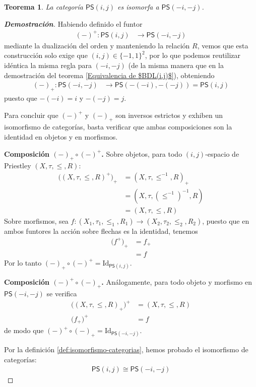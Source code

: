 \documentclass[12pt]{book}
\newtheorem{theorem}{Teorema}[section]
\newcommand{\Id}{\mathrm{Id}}
\newcommand{\PS}{\mathsf{PS}}
\begin{document}
\begin{theorem}\label{Equivalencia de $PS(i,j)$} La categoría $\PS(i,j)$ es isomorfa a $\PS(-i,-j)$.
\end{theorem}
\begin{proof}[\textbf{Demostración}]
Habiendo definido el funtor
\begin{align*}
(-)^{+} : \PS(i,j) &\to \PS(-i,-j)
\end{align*}
mediante la dualización del orden y manteniendo la relación $R$, vemos que esta construcción solo exige que $(i,j)\in\{-1,1\}^2$, por lo que podemos reutilizar idéntica la misma regla para $(-i,-j)$ (de la misma manera que en la demostración del teorema  \ref{Equivalencia de $BDL(i,j)$}), obteniendo
\begin{align*}
(-)_{+} : \PS(-i,-j) &\to \PS(-(-i),-(-j)) = \PS(i,j)
\end{align*}
puesto que $-(-i)=i$ y $-(-j)=j$.

Para concluir que $(-)^{+}$ y $(-)_{+}$ son inversos estrictos y exhiben un isomorfismo de categorías, basta verificar que ambas composiciones son la identidad en objetos y en morfismos.

\medskip
\noindent\textbf{Composición $(-)_{+}\circ(-)^{+}$.}  
Sobre objetos, para todo $(i,j)$-espacio de Priestley $(X,\tau,\le,R)$:
\begin{align*}
\bigl((X,\tau,\le,R)^{+}\bigr)_{+}
&= (X,\tau,\le^{-1},R)_{+}\\
&= (X,\tau,(\le^{-1})^{-1},R)\\
&= (X,\tau,\le,R)
\end{align*}
Sobre morfismos, sea $f\colon (X_1,\tau_1,\le_1,R_1)\to (X_2,\tau_2,\le_2,R_2)$, puesto que en ambos funtores la acción sobre flechas es la identidad, tenemos
\begin{align*}
\bigl(f^{+}\bigr)_{+}
&= f_{+}\\
&= f
\end{align*}
Por lo tanto $(-)_{+}\circ(-)^{+}=\Id_{\PS(i,j)}$.

\medskip
\noindent\textbf{Composición $(-)^{+}\circ(-)_{+}$.}  
Análogamente, para todo objeto y morfismo en $\PS(-i,-j)$ se verifica
\begin{align*}
\bigl((X,\tau,\le,R)_{+}\bigr)^{+}&=(X,\tau,\le,R)\\
\bigl(f_{+}\bigr)^{+}&=f
\end{align*}
de modo que $(-)^{+}\circ(-)_{+}=\Id_{\PS(-i,-j)}$.

\medskip
Por la definición \ref{def:isomorfismo-categorias}, hemos probado el isomorfismo de categorías:
\begin{align*}
\PS(i,j)\cong\PS(-i,-j)
\end{align*}
\end{proof}
\end{document}
